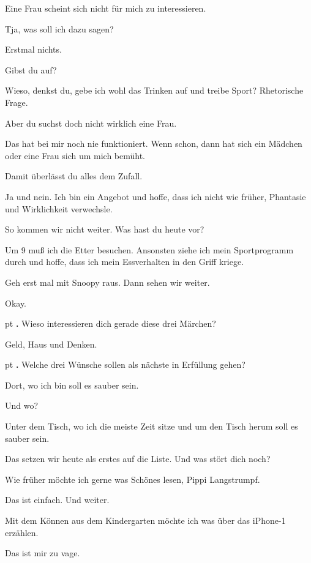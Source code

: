 \documentclass[10pt,a4paper]{article}
\newcounter{notec}
\newcommand\notep[1]{%
  \stepcounter{notec}
  \vskip #1pt
  {\bf\arabic{notec}.}
}
\begin{document}
\begin{mdframed}[style=daystyle]
  \vskip 2pt
  Eine Frau scheint sich nicht für mich zu interessieren.

  \vskip 2pt
  Tja, was soll ich dazu sagen?

  \vskip 2pt
  Erstmal nichts.

  \vskip 2pt
  Gibst du auf?

  \vskip 2pt
  Wieso, denkst du, gebe ich wohl das Trinken auf und treibe Sport? Rhetorische
  Frage.

  \vskip 2pt
  Aber du suchst doch nicht wirklich eine Frau.

  \vskip 2pt
  Das hat bei mir noch nie funktioniert. Wenn schon, dann hat sich ein Mädchen
  oder eine Frau sich um mich bemüht.

  \vskip 2pt
  Damit überlässt du alles dem Zufall.

  \vskip 2pt
  Ja und nein. Ich bin ein Angebot und hoffe, dass ich nicht wie früher,
  Phantasie und Wirklichkeit verwechsle.

  \vskip 2pt
  So kommen wir nicht weiter. Was hast du heute vor?

  \vskip 2pt
  Um 9 muß ich die Etter besuchen. Ansonsten ziehe ich mein Sportprogramm durch
  und hoffe, dass ich mein Essverhalten in den Griff kriege.

  \vskip 2pt
  Geh erst mal mit Snoopy raus. Dann sehen wir weiter.

  \vskip 2pt
  Okay.


  \notep 4 Wieso interessieren dich gerade diese drei Märchen?

  \vskip 2pt
  Geld, Haus und Denken.


  \notep 4 Welche drei Wünsche sollen als nächste in Erfüllung gehen?

  \vskip 2pt
  Dort, wo ich bin soll es sauber sein.

  \vskip 2pt
  Und wo?

  \vskip 2pt
  Unter dem Tisch, wo ich die meiste Zeit sitze und um den Tisch herum soll es sauber sein.

  \vskip 2pt
  Das setzen wir heute als erstes auf die Liste. Und was stört dich noch?

  \vskip 2pt
  Wie früher möchte ich gerne was Schönes lesen, Pippi Langstrumpf.

  \vskip 2pt
  Das ist einfach. Und weiter.

  \vskip 2pt
  Mit dem Können aus dem Kindergarten möchte ich was über das iPhone-1 erzählen.

  \vskip 2pt
  Das ist mir zu vage.


\end{mdframed}
\end{document}
